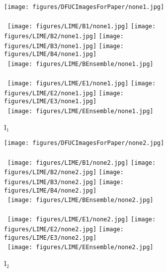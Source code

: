 \documentclass[runningheads]{llncs}
\begin{document}
\begin{figure}[ht!]
    \centering
    \begin{subfigure}[b]{0.10\textwidth}
        \centering
        \texttt{[image: figures/DFUCImagesForPaper/none1.jpg]}\\\ \\\ 
        \texttt{[image: figures/LIME/B1/none1.jpg]}
        \texttt{[image: figures/LIME/B2/none1.jpg]}
        \texttt{[image: figures/LIME/B3/none1.jpg]} 
        \texttt{[image: figures/LIME/B4/none1.jpg]}\\\ 
        \texttt{[image: figures/LIME/BEnsemble/none1.jpg]}\\\ \\\ 
        \texttt{[image: figures/LIME/E1/none1.jpg]}
        \texttt{[image: figures/LIME/E2/none1.jpg]}
        \texttt{[image: figures/LIME/E3/none1.jpg]}\\\ 
        \texttt{[image: figures/LIME/EEnsemble/none1.jpg]}
        \caption{I$_1$}
        \label{fig:lime_i1}
    \end{subfigure}
    \hfill
    \begin{subfigure}[b]{0.10\textwidth}
        \centering
        \texttt{[image: figures/DFUCImagesForPaper/none2.jpg]}\\\ \\\ 
        \texttt{[image: figures/LIME/B1/none2.jpg]} 
        \texttt{[image: figures/LIME/B2/none2.jpg]} 
        \texttt{[image: figures/LIME/B3/none2.jpg]} 
        \texttt{[image: figures/LIME/B4/none2.jpg]}\\\ 
        \texttt{[image: figures/LIME/BEnsemble/none2.jpg]} \\\ \\\ 
        \texttt{[image: figures/LIME/E1/none2.jpg]} 
        \texttt{[image: figures/LIME/E2/none2.jpg]} 
        \texttt{[image: figures/LIME/E3/none2.jpg]}\\\  
        \texttt{[image: figures/LIME/EEnsemble/none2.jpg]}
        \caption{I$_2$}
        \label{fig:lime_i2}
    \end{subfigure}
    \hfill
    \begin{subfigure}[b]{0.10\textwidth}
        \centering

\end{subfigure}
\end{figure}
\end{document}
